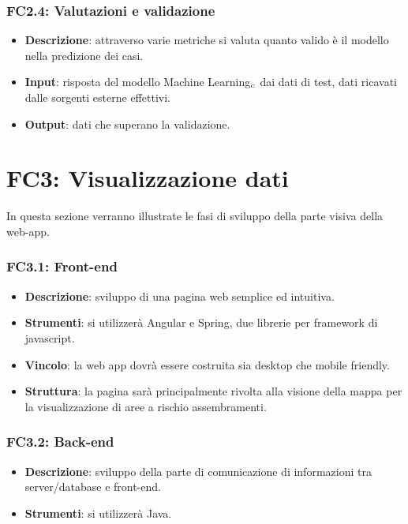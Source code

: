 \subsubsection{FC2.4: Valutazioni e validazione}

\begin{itemize}
	\item \textbf{Descrizione}: attraverso varie metriche si valuta quanto valido è il modello nella predizione dei casi.
	\item \textbf{Input}: risposta del modello Machine Learning$_{\scaleto{G}{3pt}}$ dai dati di test, dati ricavati dalle sorgenti esterne effettivi.
	\item \textbf{Output}: dati che superano la validazione.
\end{itemize}

\section{FC3: Visualizzazione dati}
In questa sezione verranno illustrate le fasi di sviluppo della parte visiva della web-app.

\subsubsection{FC3.1: Front-end}

\begin{itemize}
	\item \textbf{Descrizione}: sviluppo di una pagina web semplice ed intuitiva.
	\item \textbf{Strumenti}: si utilizzerà Angular e Spring, due librerie per framework di javascript.
	\item \textbf{Vincolo}: la web app dovrà essere costruita sia desktop che mobile friendly. 
	\item \textbf{Struttura}: la pagina sarà principalmente rivolta alla visione della mappa per la visualizzazione di aree a rischio assembramenti.
\end{itemize}

\subsubsection{FC3.2: Back-end}

\begin{itemize}
	\item \textbf{Descrizione}: sviluppo della parte di comunicazione di informazioni tra server/database e front-end.
	\item \textbf{Strumenti}: si utilizzerà Java.
\end{itemize}


